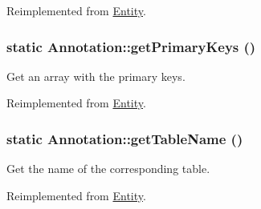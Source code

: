 Reimplemented from \hyperlink{classEntity_ad69437219c10955803707fbf6ac458e7}{Entity}.

\hypertarget{classAnnotation_a8676c5ad1cf917a17cc70bb8c816437c}{
\subsubsection[{getPrimaryKeys}]{\setlength{\rightskip}{0pt plus 5cm}static Annotation::getPrimaryKeys ()}}
\label{classAnnotation_a8676c5ad1cf917a17cc70bb8c816437c}
Get an array with the primary keys. 

Reimplemented from \hyperlink{classEntity_a61bbfbb4058427174e002a09ddc77c41}{Entity}.

\hypertarget{classAnnotation_a9bc4933ab99e52e31b622a9829edd4bb}{
\subsubsection[{getTableName}]{\setlength{\rightskip}{0pt plus 5cm}static Annotation::getTableName ()}}
\label{classAnnotation_a9bc4933ab99e52e31b622a9829edd4bb}
Get the name of the corresponding table. 

Reimplemented from \hyperlink{classEntity_a8305fd94740ac62cbafb9de76567ce37}{Entity}.



